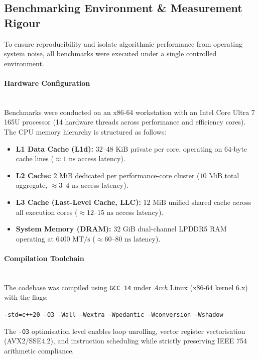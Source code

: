 \documentclass{article}
\begin{document}
\subsection{Benchmarking Environment \& Measurement Rigour} \label{sec:bench_env}
To ensure reproducibility and isolate algorithmic performance from operating system noise, all benchmarks were executed under a single controlled environment.

\paragraph{Hardware Configuration}~{}\\
Benchmarks were conducted on an x86-64 workstation with an Intel Core Ultra 7 165U processor (14 hardware threads across performance and efficiency cores). The CPU memory hierarchy is structured as follows:
\begin{itemize}
    \item \textbf{L1 Data Cache (L1d):} $32$--$48\text{ KiB}$ private per core, operating on 64-byte cache lines ($\approx 1\text{ ns}$ access latency).
    \item \textbf{L2 Cache:} $2\text{ MiB}$ dedicated per performance-core cluster ($10\text{ MiB}$ total aggregate, $\approx 3$--$4\text{ ns}$ access latency).
    \item \textbf{L3 Cache (Last-Level Cache, LLC):} $12\text{ MiB}$ unified shared cache across all execution cores ($\approx 12$--$15\text{ ns}$ access latency).
    \item \textbf{System Memory (DRAM):} $32\text{ GiB}$ dual-channel LPDDR5 RAM operating at $6400\text{ MT/s}$ ($\approx 60$--$80\text{ ns}$ latency).
\end{itemize}

\paragraph{Compilation Toolchain}~{}\\
The codebase was compiled using \texttt{GCC 14} under \emph{Arch} Linux (x86-64 kernel 6.x) with the flags:
\begin{center}
\texttt{-std=c++20 -O3 -Wall -Wextra -Wpedantic -Wconversion -Wshadow}
\end{center}
The \texttt{-O3} optimisation level enables loop unrolling, vector register vectorisation (AVX2/SSE4.2), and instruction scheduling while strictly preserving IEEE 754 arithmetic compliance.
\end{document}
